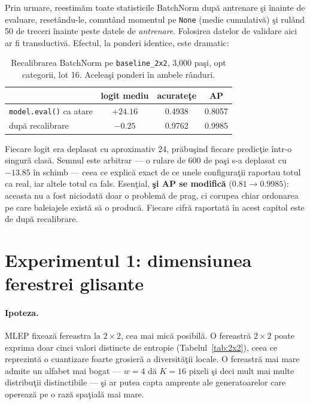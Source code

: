 Prin urmare, reestimăm toate statisticile BatchNorm după antrenare şi înainte de
evaluare, resetându-le, comutând momentul pe \texttt{None} (medie cumulativă) şi
rulând 50 de treceri înainte peste datele de \emph{antrenare}. Folosirea datelor
de validare aici ar fi transductivă. Efectul, la ponderi identice, este
dramatic:

\begin{table}[h]
  \centering
  \caption{Recalibrarea BatchNorm pe \texttt{baseline\_2x2}, 3{,}000 paşi, opt
  categorii, lot 16. Aceleaşi ponderi în ambele rânduri.}
  \label{tab:bn}
  \begin{tabular}{lccc}
    \toprule
     & logit mediu & acurateţe & AP \\
    \midrule
    \texttt{model.eval()} ca atare & $+24.16$ & 0.4938 & 0.8057 \\
    după recalibrare                & $-0.25$  & 0.9762 & 0.9985 \\
    \bottomrule
  \end{tabular}
\end{table}

Fiecare logit era deplasat cu aproximativ 24, prăbuşind fiecare predicţie într-o
singură clasă. Semnul este arbitrar --- o rulare de 600 de paşi s-a deplasat cu
$-13.85$ în schimb --- ceea ce explică exact de ce unele configuraţii raportau
totul ca real, iar altele totul ca fals. Esenţial, \textbf{şi AP se modifică}
($0.81 \to 0.9985$): aceasta nu a fost niciodată doar o problemă de prag, ci
corupea chiar ordonarea pe care baleiajele există să o producă. Fiecare cifră
raportată în acest capitol este de după recalibrare.

\section{Experimentul 1: dimensiunea ferestrei glisante}
\label{sec:exp-window}

\paragraph{Ipoteza.} MLEP fixează fereastra la $2\times2$, cea mai mică posibilă.
O fereastră $2\times2$ poate exprima doar cinci valori distincte de entropie
(Tabelul~\ref{tab:2x2}), ceea ce reprezintă o cuantizare foarte grosieră a
diversităţii locale. O fereastră mai mare admite un alfabet mai bogat ---
$w=4$ dă $K=16$ pixeli şi deci mult mai multe distribuţii distinctibile --- şi
ar putea capta amprente ale generatoarelor care operează pe o rază spaţială mai
mare.

